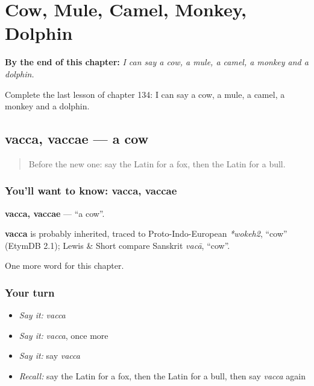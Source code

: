 
\chapter{Cow, Mule, Camel, Monkey, Dolphin}
\label{ch:la-cow-mule-camel-monkey-dolphin}

\begin{chapteropening}
\textbf{By the end of this chapter:} \emph{I can say a cow, a mule, a camel, a monkey and a dolphin.}

Complete the last lesson of chapter 134: I can say a cow, a mule, a camel, a monkey and a dolphin.
\end{chapteropening}

\section[vacca, vaccae]{vacca, vaccae — a cow}

\label{lesson:LA-C134-vacca}



\begin{quote}
Before the new one: say the Latin for a fox, then the Latin for a bull.
\end{quote}

\subsection*{You'll want to know: vacca, vaccae}
\textbf{vacca, vaccae} — \textquotedblleft{}a cow\textquotedblright{}.

\begin{cousinweb}
\textbf{vacca} is probably inherited, traced to Proto-Indo-European \emph{*wokeh2}, \textquotedblleft{}cow\textquotedblright{} (EtymDB 2.1); Lewis \& Short compare Sanskrit \emph{vacā}, \textquotedblleft{}cow\textquotedblright{}.
\end{cousinweb}

\begin{grammarlens}[title={What you've built}]
One more word for this chapter.
\end{grammarlens}

\subsection*{Your turn}
\begin{itemize}
\raggedright
  \item \emph{Say it:} \emph{vacca}
  \item \emph{Say it:} \emph{vacca}, once more
  \item \emph{Say it:} say \emph{vacca}
  \item \emph{Recall:} say the Latin for a fox, then the Latin for a bull, then say \emph{vacca} again
\end{itemize}

